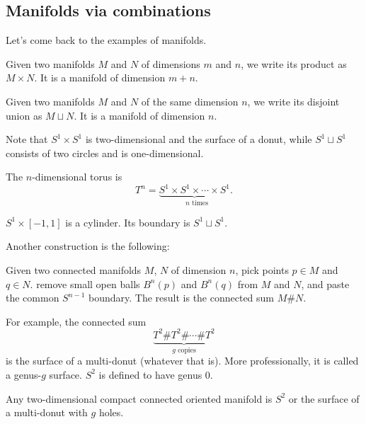 \documentclass[12pt]{article}
\numberwithin{equation}{section}
\numberwithin{figure}{section}
\theoremstyle{remark}
\begin{document}
\subsection{Manifolds via combinations}

Let's come back to the examples of manifolds.

\begin{notation}
 Given two manifolds $M$ and $N$ of dimensions $m$ and $n$,
 we write its product as $M\times N$.
It is a manifold of dimension $m+n$.
\end{notation}

\begin{notation}
Given two manifolds $M$ and $N$ of the same dimension $n$,
we write its disjoint union as $M\sqcup N$.
It is a manifold of dimension $n$.
\end{notation}

Note that $S^1\times S^1$ is two-dimensional and the surface of a donut,
while $S^1\sqcup S^1$ consists of two circles and is one-dimensional.

\begin{example}
  The $n$-dimensional torus is \begin{equation}
    T^n = \underbrace{S^1\times S^1\times \cdots \times S^1}_\text{ $n$ times}.
  \end{equation}
\end{example}

\begin{example}
$S^1\times [-1,1]$ is a cylinder. Its boundary is $S^1\sqcup S^1$.
\end{example}

Another construction is the following:
\begin{notation}
  Given two connected manifolds $M$, $N$ of dimension $n$,
  pick points $p\in M$ and $q\in N$.
  remove small open balls $B^n(p)$ and $B^n(q)$ from $M$ and $N$, and
  paste the common $S^{n-1}$ boundary.
  The result is the connected sum $M\# N$.
\end{notation}

For example, the connected sum 
\begin{equation}
  \underbrace{T^2 \# T^2 \# \cdots \# T^2}_\text{$g$ copies}
\end{equation}
is the surface of a multi-donut (whatever that is).
More professionally, it is called a genus-$g$ surface.
$S^2$ is defined to have genus 0.

\begin{fact}
Any two-dimensional compact connected oriented manifold is $S^2$ or 
the surface of a multi-donut with $g$ holes.
\end{fact}
\end{document}
